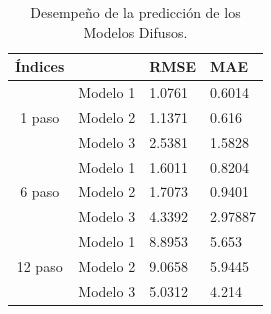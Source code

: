 \documentclass[12pt]{article}
\begin{document}
\begin{table}[htbp]
  \centering
  \caption{ Desempeño de la predicción de los Modelos Difusos.}
\begin{tabular}{|c|c|l|l|}
\hline
\multicolumn{1}{|l|}{Índices} & \multicolumn{1}{l|}{} & RMSE   & MAE     \\ \hline
\multirow{3}{*}{1   paso}     & Modelo 1              & 1.0761 & 0.6014  \\ \cline{2-4}
                              & Modelo 2              & 1.1371 & 0.616   \\ \cline{2-4}
                              & Modelo 3              & 2.5381 & 1.5828  \\ \hline
\multirow{3}{*}{6   paso}     & Modelo 1              & 1.6011 & 0.8204  \\ \cline{2-4}
                              & Modelo 2              & 1.7073 & 0.9401  \\ \cline{2-4}
                              & Modelo 3              & 4.3392 & 2.97887 \\ \hline
\multirow{3}{*}{12   paso}    & Modelo 1              & 8.8953 & 5.653   \\ \cline{2-4}
                              & Modelo 2              & 9.0658 & 5.9445  \\ \cline{2-4}
                              & Modelo 3              & 5.0312 & 4.214   \\ \hline
\end{tabular}
  \label{t_MDP}%
\end{table}%
\end{document}
